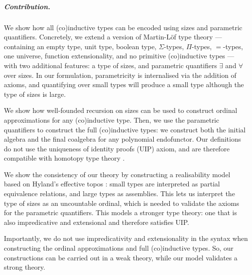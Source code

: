 \documentclass[10pt,a4paper]{article}
\theoremstyle{definition}
\theoremstyle{remark}
\renewcommand{\.}{.\,} %
\renewcommand{\:}{:} %
\newcommand{\0}{\mathbf{0}}
\newcommand{\1}{\mathbf{1}}
\newcommand\<\langle
\renewcommand\>\rangle
\theoremstyle{remark}
\begin{document}
\subparagraph*{Contribution.}
We show how all (co)inductive types can be encoded using sizes and parametric quantifiers.
Concretely, we extend a version of Martin-L\"of type theory --- containing an empty type, unit type, boolean type, \(\Sigma\)-types, \(\Pi\)-types, \(=\)-types, one universe, function extensionality, and no primitive (co)inductive types --- with two additional features: a type of sizes, and parametric quantifiers \(\exists\) and \(\forall\) over sizes.
In our formulation, parametricity is internalised via the addition of axioms, and quantifying over small types will produce a small type although the type of sizes is large.

We show how well-founded recursion on sizes can be used to construct ordinal approximations for any (co)inductive type.
Then, we use the parametric quantifiers to construct the full (co)inductive types: we construct both the initial algebra and the final coalgebra for any polynomial endofunctor.
Our definitions do not use the uniqueness of identity proofs (UIP) axiom, and are therefore compatible with homotopy type theory \cite{hottbook}.

We show the consistency of our theory by constructing a realisability model based on Hyland's effective topos \cite{hyland_effective_1982}: small types are interpreted as partial equivalence relations, and large types as assemblies.
This lets us interpret the type of sizes as an uncountable ordinal, which is needed to validate the axioms for the parametric quantifiers.
This models a stronger type theory: one that is also impredicative and extensional and therefore satisfies UIP.

Importantly, we do not use impredicativity and extensionality in the syntax when constructing the ordinal approximations and full (co)inductive types.
So, our constructions can be carried out in a weak theory, while our model validates a strong theory.
\end{document}
